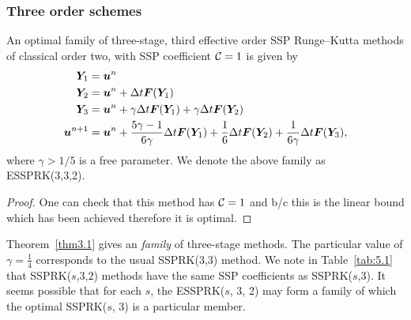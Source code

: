 \subsubsection{Three order schemes}\label{subsubsection3.4.1}




\begin{theorem}\label{thm3.1}
  An  optimal family of three-stage, third effective order
  SSP Runge--Kutta methods of classical order two, with SSP
  coefficient $\mathcal{C}=1$ is given by
    \begin{displaymath}
        \begin{split}
            \bm{Y}_{1} &= \bm{u}^{n} \\
            \bm{Y}_{2} &= \bm{u}^{n} + \Delta t\bm{F}(\bm{Y}_{1}) \\
            \bm{Y}_{3} &= \bm{u}^{n} + \gamma\Delta t\bm{F}(\bm{Y}_{1}) + \gamma\Delta t\bm{F}(\bm{Y}_{2}) \\
            \bm{u}^{n+1} &= \bm{u}^{n} + \frac{5\gamma-1}{6\gamma}\Delta t\bm{F}(\bm{Y}_{1}) + \frac{1}{6}\Delta t\bm{F}(\bm{Y}_{2}) + \frac{1}{6\gamma}\Delta t\bm{F}(\bm{Y}_{3}),
        \end{split}
    \end{displaymath}
    where \( \gamma > 1/5 \) is a free parameter. We denote the above family as ESSPRK(3,3,2).
\end{theorem}


\begin{proof}
One can check that this method has $\mathcal{C} = 1$ and b/c this is the linear bound which has been achieved therefore it is optimal.
\end{proof}


Theorem~\ref{thm3.1} gives an \emph{family} of three-stage methods.
The particular value of $\gamma = \frac{1}{4}$ corresponds to the
usual SSPRK(3,3) method.  We note in Table~\ref{tab:5.1} that
SSPRK(\( s \),\( 3 \),\( 2 \)) methods have the same SSP coefficients
as SSPRK(\( s \),\( 3 \)).  It seems possible that for each $s$, the
ESSPRK($s$, 3, 2) may form a family of which the optimal SSPRK($s$, 3)
is a particular member.


